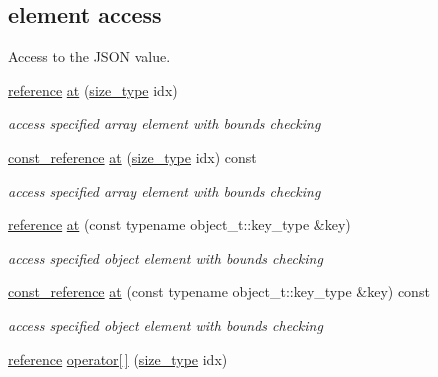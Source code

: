 \subsection*{element access}
\label{_amgrpf68418821a90b03a001117a613b131dd}%
Access to the J\+S\+ON value. \begin{DoxyCompactItemize}
\item 
\hyperlink{classnlohmann_1_1basic__json_ac6a5eddd156c776ac75ff54cfe54a5bc}{reference} \hyperlink{classnlohmann_1_1basic__json_a73ae333487310e3302135189ce8ff5d8}{at} (\hyperlink{classnlohmann_1_1basic__json_a39f2cd0b58106097e0e67bf185cc519b}{size\+\_\+type} idx)
\begin{DoxyCompactList}\small\item\em access specified array element with bounds checking \end{DoxyCompactList}\item 
\hyperlink{classnlohmann_1_1basic__json_a4057c5425f4faacfe39a8046871786ca}{const\+\_\+reference} \hyperlink{classnlohmann_1_1basic__json_a5af365239f7d540b34c31b25e382333b}{at} (\hyperlink{classnlohmann_1_1basic__json_a39f2cd0b58106097e0e67bf185cc519b}{size\+\_\+type} idx) const 
\begin{DoxyCompactList}\small\item\em access specified array element with bounds checking \end{DoxyCompactList}\item 
\hyperlink{classnlohmann_1_1basic__json_ac6a5eddd156c776ac75ff54cfe54a5bc}{reference} \hyperlink{classnlohmann_1_1basic__json_a93403e803947b86f4da2d1fb3345cf2c}{at} (const typename object\+\_\+t\+::key\+\_\+type \&key)
\begin{DoxyCompactList}\small\item\em access specified object element with bounds checking \end{DoxyCompactList}\item 
\hyperlink{classnlohmann_1_1basic__json_a4057c5425f4faacfe39a8046871786ca}{const\+\_\+reference} \hyperlink{classnlohmann_1_1basic__json_a8471c693500db2e8c868ec4371d402a6}{at} (const typename object\+\_\+t\+::key\+\_\+type \&key) const 
\begin{DoxyCompactList}\small\item\em access specified object element with bounds checking \end{DoxyCompactList}\item 
\hyperlink{classnlohmann_1_1basic__json_ac6a5eddd156c776ac75ff54cfe54a5bc}{reference} \hyperlink{classnlohmann_1_1basic__json_ac871e3b03fb2eeca9a8de4db2bea760f}{operator\mbox{[}$\,$\mbox{]}} (\hyperlink{classnlohmann_1_1basic__json_a39f2cd0b58106097e0e67bf185cc519b}{size\+\_\+type} idx)

\end{DoxyCompactItemize}
